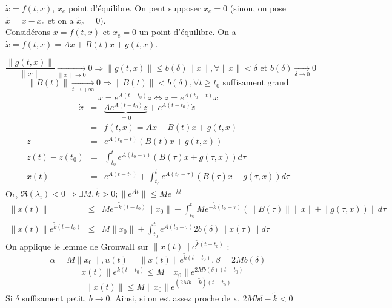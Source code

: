 $\dot{x}=f(t,x)$, $x_e$ point d'équilibre. On peut supposer $x_e=0$ (sinon, on pose $\tilde{x}=x-x_e$ et on a $\tilde{x}_e=0$).\\
Considérons $\dot{x}=f(t,x)$ et $x_e=0$ un point d'équilibre. On a $\dot{x}=f(t,x)=Ax+B(t)x+g(t,x)$. 


\begin{dem}
	\[\frac{\|g(t,x)\|}{\|x\|}\xrightarrow[\|x\|\to0]{}0 \Rightarrow \|g(t,x)\|\leq b(\delta)\|x\|, \forall \|x\|<\delta \text{ et } b(\delta)\xrightarrow[\delta\to 0]{}0\]
	\[\|B(t)\|\xrightarrow[t\to+\infty]{}0 \Rightarrow \|B(t)\|<b(\delta), \forall t\geq t_0 \text{ suffisament grand}\]
	\[x=e^{A(t-t_0)}z \Leftrightarrow z=e^{A(t_0-t)}x\]
	\begin{eqnarray*}
		\dot{x}&=&\underbrace{Ae^{A(t-t_0)}z}_{=0}+e^{A(t-t_0)}\dot{z}\\
			&=&f(t,x)=Ax+B(t)x + g(t,x)
	\end{eqnarray*}
	\begin{eqnarray*}
		\dot{z}&=&e^{A(t_0-t)}(B(t)x+g(t,x))\\
		z(t)-z(t_0)&=&\int_{t_0}^t e^{A(t_0-\tau)}(B(\tau)x+g(\tau,x))d\tau\\
		x(t)&=&e^{A(t-t_0)}+\int_{t_0}^t e^{A(t_0-\tau)}(B(\tau)x+g(\tau,x))d\tau
	\end{eqnarray*}
	Or, $\Re(\lambda_i)<0 \Rightarrow \exists M, \tilde{k}>0; \|e^{At}\|\leq Me^{-\tilde{k}t}$
	\begin{eqnarray*}
		\|x(t)\|&\leq&Me^{-\tilde{k}(t-t_0)}\|x_0\| + \int_{t_0}^t Me^{-\tilde{k}(t_0-\tau)}(\|B(\tau)\|\|x\|+\|g(\tau,x))\|d\tau\\
		\|x(t)\|e^{\tilde{k}(t-t_0)}&\leq&M\|x_0\| + \int_{t_0}^t e^{A(t_0-\tau)}2b(\delta)\|x(\tau)\|d\tau
	\end{eqnarray*}
	On applique le lemme de Gronwall sur $\|x(t)\|e^{\tilde{k}(t-t_0)}$ :
	\[\alpha=M\|x_0\|, u(t)=\|x(t)\|e^{\tilde{k}(t-t_0)}, \beta=2Mb(\delta)\]
	\[\|x(t)\|e^{\tilde{k}(t-t_0)}\leq M\|x_0\|e^{2Mb(\delta)(t-t_0)}\]
	\[\|x(t)\|\leq M\|x_0\|e^{(2Mb-\tilde{k})(t-t_0)}\]
	Si $\delta$ suffisament petit, $b\to 0$. Ainsi, si on est assez proche de x, $2Mb\delta-\tilde{k}<0$
\end{dem}

